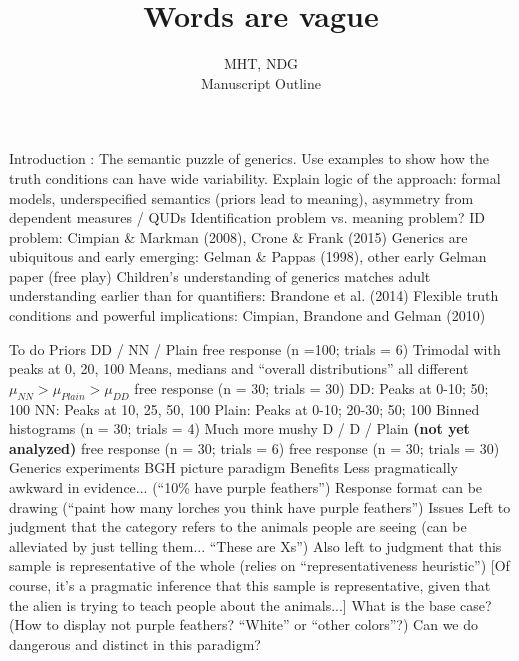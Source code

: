 \documentclass{article}
\begin{document}
\title{Words are vague}
\author{MHT, NDG\\Manuscript Outline} \maketitle
 
\begin{outline}
  \0
  
  		\1 Introduction : The semantic puzzle of generics. Use examples to show how the truth conditions can have wide variability. Explain logic of the approach: formal models, underspecified semantics (priors lead to meaning), asymmetry from dependent measures / QUDs
			\2 Identification problem vs. meaning problem? 
				\3 ID problem: Cimpian \& Markman (2008), Crone \& Frank (2015)
			\2 Generics are ubiquitous and early emerging: Gelman \& Pappas (1998), other early Gelman paper (free play)
			\2 Children's understanding of generics matches adult understanding earlier than for quantifiers: Brandone et al. (2014)
			\2 Flexible truth conditions and powerful implications: Cimpian, Brandone and Gelman (2010)
	
\vspace{2cm}
	\0 To do
		\1 Priors
			\2 DD / NN / Plain
				 free response (n =100; trials = 6)
					\4 Trimodal with peaks at 0, 20, 100
					\4 Means, medians and ``overall distributions'' all different
					\4$ \mu_{NN} > \mu_{Plain} > \mu_{DD} $
				 free response (n = 30; trials = 30)
					\4 DD: Peaks at 0-10; 50; 100
					\4 NN: Peaks at 10, 25, 50, 100
					\4 Plain: Peaks at 0-10; 20-30; 50; 100
				\3 Binned histograms (n = 30; trials = 4)
					\4 Much more mushy
			\2 D / D / Plain \textbf{(not yet analyzed)}
				 free response (n = 30; trials = 6)
				 free response (n = 30; trials = 30)
		\1 Generics experiments
			\2 BGH picture paradigm
				\3 Benefits
					\4 Less pragmatically awkward in evidence... (``10\% have purple feathers'')
					\4 Response format can be drawing (``paint how many lorches you think have purple feathers'')
				\3 Issues
					\4 Left to judgment that the category refers to the animals people are seeing (can be alleviated by just telling them... ``These are Xs'')
					\4 Also left to judgment that this sample is representative of the whole (relies on ``representativeness heuristic'') [Of course, it's a pragmatic inference that this sample is representative, given that the alien is trying to teach people about the animals...]
					\4 What is the base case? (How to display not purple feathers? ``White'' or ``other colors''?)
					\4 Can we do dangerous and distinct in this paradigm?
					

\end{outline}
\end{document}
